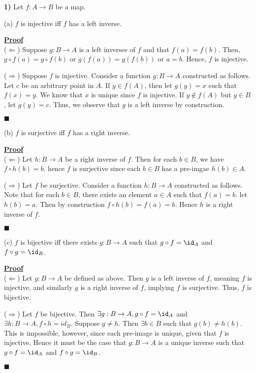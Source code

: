\documentclass[12pt,a4paper]{article}
\newcommand{\prob}[2]{\textbf{#1)} #2}
\newenvironment{proof}{\textbf{\underline{Proof}} \\}{\begin{flushright}$\blacksquare$\end{flushright}}
\begin{document}
\prob{1}{Let $f: A \rightarrow B$ be a map.} 

(a) $f$ is injective iff $f$ has a left inverse.

\begin{proof}
($\Leftarrow$) Suppose $g: B \rightarrow A$ is a left inversee of $f$ and that $f(a) = f(b)$. Then, $g \circ f(a) = g \circ f(b)$ or $g(f(a)) = g(f(b))$ or $a = b$. Hence, $f$ is injective.

($\Rightarrow$) Suppose $f$ is injective. Consider a function $g: B \rightarrow A$ constructed as follows. Let $c$ be an arbitrary point in $A$. If $y \in f(A)$, then let $g(y) = x$ such that $f(x) = y$. We know that $x$ is unique since $f$ is injective. If $y \not\in f(A)$ but $y \in B$, let $g(y) = c$. Thus, we observe that $g$ is a left inverse by construction.
\end{proof}

(b) $f$ is surjective iff $f$ has a right inverse.

\begin{proof}
($\Leftarrow$) Let $h: B \rightarrow A$ be a right inverse of $f$. Then for each $b \in B$, we have $f \circ h(b) = b$. hence $f$ is surjective since each $b \in B$ has a pre-imgae $h(b) \in A$.

($\Rightarrow$) Let $f$ be surjective. Consider a function $h: B \rightarrow A$ constructed as follows. Note that for each $b \in B$, there exists an element $a \in A$ such that $f(a) = b$. let $h(b) = a$. Then by construction $f \circ h(b) = f(a) = b$. Hence $h$ is a right inverse of $f$. 
\end{proof}

(c) $f$ is bijective iff there exists $g: B \rightarrow A$ such that $g \circ f = \id_{A}$ and $f \circ g = \id_{B}$.

\begin{proof}
($\Leftarrow$) Let $g: B \rightarrow A$ be defined as above. Then $g$ is a left inverse of $f$, meaning $f$ is injective, and similarly $g$ is a right inverse of $f$, implying $f$ is surjective. Thus, $f$ is bijective.

($\Rightarrow$) Let $f$ be bijective. Then $\exists g: B \rightarrow A, g \circ f = \id_{A}$ and $\exists h: B \rightarrow A, f \circ h = id_{B}$. Suppose $g \not= h$. Then $\exists b \in B$ such that $g(b) \not= h(b)$. This is impossible, however, since  each pre-image is unique, given that $f$ is injective. Hence it must be the case that $g: B \rightarrow A$ is a unique inverse such that $g \circ f = \id_{A}$ and $f \circ g = \id_{B}$.
\end{proof}
\end{document}
